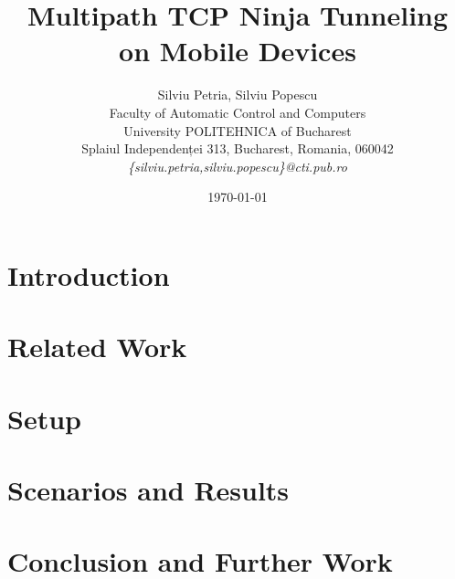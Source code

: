 \documentclass[12pt]{article}
\title{Multipath TCP Ninja Tunneling on Mobile Devices}
\author{Silviu Petria, Silviu Popescu\\
Faculty of Automatic Control and Computers\\
University POLITEHNICA of Bucharest\\
Splaiul Independenței 313, Bucharest, Romania, 060042 \\
\emph{\{silviu.petria,silviu.popescu\}@cti.pub.ro}}
\date{\today}
\begin{document}
\maketitle

\begin{abstract}

\end{abstract}

\section{Introduction}
\label{sec:introduction}


\section{Related Work}
\label{sec:related}


\section{Setup}
\label{sec:setup}


\section{Scenarios and Results}
\label{sec:results}


\section{Conclusion and Further Work}
\label{sec:conclusion}




\end{document}
